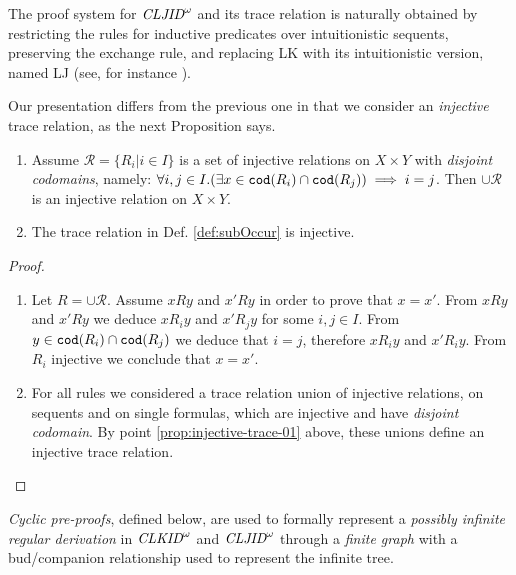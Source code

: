 The proof system for $\textit{CLJID}^\omega$ and its trace relation is naturally obtained by restricting the rules for inductive predicates over intuitionistic sequents, preserving the exchange rule, and replacing LK with its intuitionistic version, named LJ (see, for instance \cite{Berardi}). 

Our presentation differs from the previous one in that we consider an \emph{injective} trace
relation, as the next Proposition says.

\newcommand{\codom} {{\tt cod}}

\begin{proposition}
\label{prop:injective-trace}
\begin{enumerate}
\item
\label{prop:injective-trace-01}
Assume ${\mathcal R} = \{R_i | i \in I\}$ is a set of injective relations on $X \times Y$
with \emph{disjoint codomains}, namely: $\forall i,j\in I. (\exists x \in \codom(R_i) \cap \codom(R_j)) \implies i=j$.
Then $\cup {\mathcal R}$ is an injective relation on $X \times Y$. 
\item
\label{prop:injective-trace-02}
The trace relation in Def. \ref{def:subOccur} is injective.
\end{enumerate}
\end{proposition}

\begin{proof}
\begin{enumerate}
\item
Let $R = \cup {\mathcal R}$. Assume $x R y$ and $x' R y$ in order to prove that
$x = x'$. From $x R y$ and $x' R y$ we deduce
$x R_i y$ and $x' R_j y$ for some $i,j \in I$. From $y \in \codom(R_i) \cap \codom(R_j)$
we deduce that $i = j$, therefore $x R_i y$ and $x' R_i y$. 
From $R_i$ injective we conclude that $x = x'$.
\item
For all rules we considered a trace relation union of injective relations, 
on sequents and on single formulas, which are injective and have \emph{disjoint codomain}. 
By point \ref{prop:injective-trace-01} above, these unions define an injective trace relation.
\end{enumerate}
\end{proof}

\emph{Cyclic pre-proofs}, defined below, are used to formally represent a 
\emph{possibly infinite regular derivation} in $\textit{CLKID}^\omega$ and $\textit{CLJID}^\omega$
 through a \emph{finite graph} with a bud/companion relationship used to represent 
 the infinite tree.

